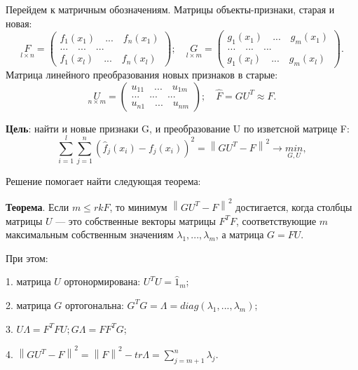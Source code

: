 Перейдем к матричным обозначениям. Матрицы объекты-признаки, старая и новая:
\begin{equation}
    \underset{l \times n}{F} = \begin{pmatrix} f_1(x_1) \quad ... \quad f_n(x_1) \\ ... \quad ... \quad ... \\ f_1(x_l) \quad ... \quad f_n(x_l) \end{pmatrix}; \quad \underset{l \times m}{G} = \begin{pmatrix} g_1(x_1) \quad ... \quad g_m(x_1) \\ ... \quad ... \quad ... \\ g_1(x_l) \quad ... \quad g_m(x_l) \end{pmatrix}.
\end{equation}
Матрица линейного преобразования новых признаков в старые:
\begin{equation}
    \underset{n \times m}{U} = \begin{pmatrix} u_{11} \quad ... \quad u_{1m} \\ ... \quad ... \quad ... \\ u_{n1} \quad ... \quad u_{nm} \end{pmatrix}; \quad \hat{F} = GU^{T} \approx F.
\end{equation}

\textbf{Цель}: найти и новые признаки G, и преобразование U по изветсной матрице F:
\begin{equation}
    \sum_{i=1}^{l}\sum_{j=1}^{n}(\hat{f}_j(x_i) - f_j(x_i))^{2} = \left\| GU^{T} - F \right\|^{2} \rightarrow \underset{G, U}{min},
\end{equation}

Решение помогает найти следующая теорема:

\textbf{Теорема}. Если $m \leq rk F$, то минимум $\left\| GU^{T} - F \right\|^{2}$ достигается, когда столбцы матрицы $U$ — это собственные векторы матрицы $F^{T}F$, соответствующие $m$ максимальным собственным значениям $\lambda_1, ..., \lambda_m$, а матрица $G = FU$.

При этом:

1. матрица $U$ ортонормирована: $U^{T}U = \hat{1}_m$;

2. матрица $G$ ортогональна: $G^{T}G = \Lambda = diag(\lambda_1, ..., \lambda_m)$;

3. $U \Lambda = F^{T}FU; G\Lambda = FF^{T}G$;

4. $\left\| GU^{T} - F \right\|^{2} = \left\|F\right\|^{2} - tr \Lambda = \sum_{j = m+1}^{n} \lambda_j$.

